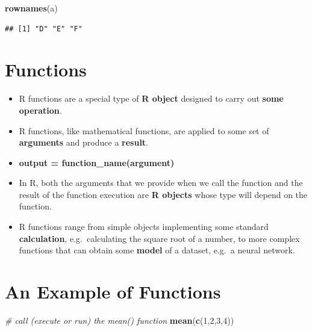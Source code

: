 \documentclass[]{book}
\newenvironment{Shaded}{\begin{snugshade}}{\end{snugshade}}
\newcommand{\CommentTok}[1]{\textcolor[rgb]{0.56,0.35,0.01}{\textit{#1}}}
\newcommand{\DecValTok}[1]{\textcolor[rgb]{0.00,0.00,0.81}{#1}}
\newcommand{\KeywordTok}[1]{\textcolor[rgb]{0.13,0.29,0.53}{\textbf{#1}}}
\newcommand{\NormalTok}[1]{#1}
\providecommand{\tightlist}{%
  \setlength{\itemsep}{0pt}\setlength{\parskip}{0pt}}
\begin{document}
\begin{Shaded}
\begin{Highlighting}[]
\KeywordTok{rownames}\NormalTok{(a)}
\end{Highlighting}
\end{Shaded}

\begin{verbatim}
## [1] "D" "E" "F"
\end{verbatim}

\hypertarget{functions}{%
\section{Functions}\label{functions}}

\begin{itemize}
\tightlist
\item
  R functions are a special type of \textbf{R object} designed to carry out \textbf{some operation}.
\item
  R functions, like mathematical functions, are applied to some set of \textbf{arguments} and produce a \textbf{result}.
\item
  \textbf{output = function\_name(argument)}
\item
  In R, both the arguments that we provide when we call the function and the result of the function execution are \textbf{R objects} whose type will depend on the function.
\item
  R functions range from simple objects implementing some standard \textbf{calculation}, e.g.~calculating the square root of a number, to more complex functions that can obtain some \textbf{model} of a dataset, e.g.~a neural network.
\end{itemize}

\hypertarget{an-example-of-functions}{%
\section{An Example of Functions}\label{an-example-of-functions}}

\begin{Shaded}
\begin{Highlighting}[]
\CommentTok{# call (execute or run) the mean() function}
\KeywordTok{mean}\NormalTok{(}\KeywordTok{c}\NormalTok{(}\DecValTok{1}\NormalTok{,}\DecValTok{2}\NormalTok{,}\DecValTok{3}\NormalTok{,}\DecValTok{4}\NormalTok{))    }
\end{Highlighting}
\end{Shaded}
\end{document}
